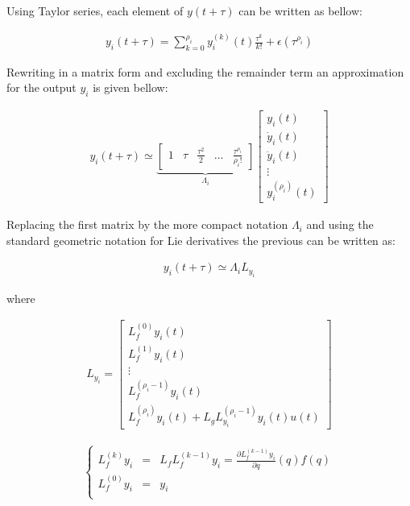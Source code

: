 \documentclass[letterpaper, 10 pt, conference]{ieeeconf}  %
\begin{document}
Using Taylor series, each element of ${y(t+\tau)}$ can be written as bellow:

\begin{align*}
y_i(t+\tau) = \sum_{k=0}^{\rho_i} 
y^{(k)}_i(t)\frac{\tau^k}{k!} + \epsilon(\tau^{\rho_i})
\end{align*}

Rewriting in a matrix form and excluding the remainder term an approximation for the output $y_i$ is given bellow:

\begin{eqnarray}
y_i(t+\tau) \simeq \underbrace{\left[\begin{array}{ccccc}
1 & \tau & \frac{\tau^2}{2} & \dots & \frac{\tau^{\rho_i}}{{\rho_i}!}
\end{array}\right]}_{\Lambda_i}
\left[\begin{array}{c}
y_i(t)\\
\dot{y}_i(t)\\
\ddot{y}_i(t)\\
\vdots\\
y^{(\rho_i)}_i(t)
\end{array}\right]
\end{eqnarray}

Replacing the first matrix by the more compact notation $\Lambda_i$ and using the standard geometric notation for Lie derivatives the previous can be written as:

\begin{eqnarray}
y_i(t+\tau) \simeq \Lambda_i L_{y_i}
\end{eqnarray}

where

\begin{eqnarray*}
L_{y_i} = \left[\begin{array}{c}
L_f^{(0)}y_i(t)\\
L_f^{(1)}y_i(t)\\
\vdots\\
L^{({\rho_i}-1)}_fy_i(t)\\
L^{({\rho_i})}_fy_i(t)+L_gL_{y_i}^{({\rho_i}-1)}y_i(t)u(t)
\end{array}\right]
\end{eqnarray*}


\begin{eqnarray*}
\left\lbrace\begin{array}{lcl}
L_f^{(k)} y_i & = & L_fL_f^{(k-1)}y_i = \frac{\partial L_f^{(k-1)}y_i}{\partial q}(q)f(q)\\
L_f^{(0)}y_i & = & y_i\\
\end{array}\right.
\end{eqnarray*}
\end{document}
